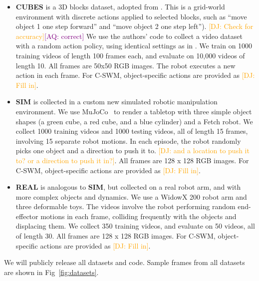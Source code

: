 \documentclass{article}
\newcommand{\jd}[1]{\textcolor{orange}{[DJ: #1]}}
\newcommand{\aq}[1]{\textcolor{purple}{[AQ: #1]}}
\begin{document}
\begin{itemize}[leftmargin=*]
    \item \textbf{CUBES} is a 3D blocks dataset, adopted from \citet{kipf2019contrastive}. This is a grid-world environment with discrete actions applied to selected blocks, such as ``move object 1 one step forward'' and ``move object 2 one step left''). \jd{Check for accuracy}\aq{correct} We use the authors' code to collect a video dataset with a random action policy, using identical settings as in \citet{kipf2019contrastive}. We train on 1000 training videos of length 100 frames each, and evaluate on 10,000 videos of length 10. All frames are 50x50 RGB images. The robot executes a new action in each frame. For C-SWM, object-specific actions are provided as \jd{Fill in}.
    \item \textbf{SIM} is collected in a custom new simulated robotic manipulation environment. We use MuJoCo~\cite{todorov2012mujoco} to render a tabletop with three simple object shapes (a green cube, a red cube, and a blue cylinder) and a Fetch robot. We collect 1000 training videos and 1000 testing videos, all of length 15 frames, involving 15 separate robot motions. In each episode, the robot randomly picks one object and a direction to push it to. \jd{and a location to push it to? or a direction to push it in?}.  All frames are 128 x 128 RGB images. For C-SWM, object-specific actions are provided as \jd{Fill in}.
    \item \textbf{REAL} is analogous to \textbf{SIM}, but collected on a real robot arm, and with more complex objects and dynamics. We use a WidowX 200 robot arm and three deformable toys. The videos involve the robot performing random end-effector motions in each frame, colliding frequently with the objects and displacing them. We collect 350 training videos, and evaluate on 50 videos, all of length 30. All frames are 128 x 128 RGB images. For C-SWM, object-specific actions are provided as \jd{Fill in}.
\end{itemize}

We will publicly release all datasets and code. Sample frames from all datasets are shown in Fig~\ref{fig:datasets}.


\end{document}

